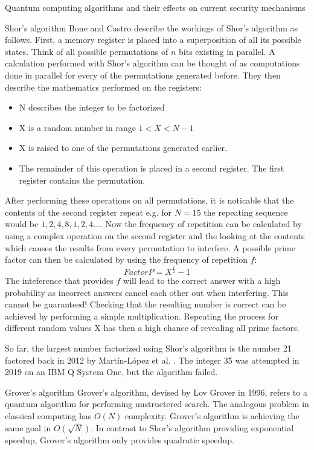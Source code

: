 \documentclass[aps,preprintnumbers,twocolumn]{revtex4}
\begin{document}
\begin{section}{Quantum computing algorithms and their effects on current security mechanisms}
\begin{subsection}{Shor's algorithm}
Bone and Castro \cite[p.6-9]{Bone} describe the workings of Shor's algorithm as follows. First, a memory register is placed into a superposition of all its possible states. Think of all possible permutations of $n$ bits existing in parallel.
A calculation performed with Shor's algorithm can be thought of as computations done in parallel for every of the permutations generated before. 
They then describe the mathematics performed on the registers: 
\begin{itemize} 
    \item N describes the integer to be factorized
    \item X is a random number in range $1 < X < N-1$
    \item X is raised to one of the permutations generated earlier.
    \item The remainder of this operation is placed in a second register. The first register contains the permutation.
\end{itemize}
After performing these operations on all permutations, it is noticable that the contents of the second register repeat e.g. for $N = 15$ the repeating sequence would be $1,2,4,8,1,2,4...$.
Now the frequency of repetition can be calculated by using a complex operation on the second register and the looking at the contents which causes the results from every permutation to interfere. A possible prime factor can then be calculated by using the frequency of repetition $f$:
\begin{equation}
Factor P = X^{\frac{f}{2}}-1
\end{equation}
The inteference that provides $f$ will lead to the correct answer with a high probability as incorrect answers cancel each other out when interfering. This cannot be guaranteed! Checking that the resulting number is correct can be achieved by performing a simple multiplication. Repeating the process for different random values X has then a high chance of revealing all prime factors.

So far, the largest number factorized using Shor's algorithm 
 is the number 21 factored back in 2012 by Martín-López et al. \cite{article}. 
The integer 35 was attempted in 2019 on an IBM Q System One, 
but the algorithm failed. 
\end{subsection}

\begin{subsection}{Grover's algorithm}
Grover's algorithm, devised by Lov Grover in 1996,
refers to a quantum algorithm for performing unstructered search. 
The analogous problem in classical computing has $O(N)$ complexity. 
Grover's algorithm is achieving the same goal in $O(\sqrt{N})$. 
In contrast to Shor's algorithm providing exponential speedup, 
Grover's algorithm only provides quadratic speedup. 


\end{subsection}
\end{section}
\end{document}

